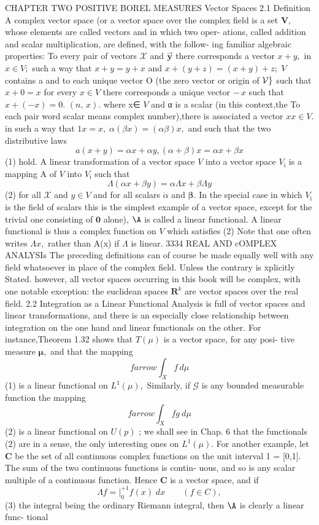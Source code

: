 CHAPTER TWO POSITIVE BOREL MEASURES Vector Spaces 2.1 Definition A complex vector space (or a vector space over the complex field is a set ${\boldsymbol{V}},$ whose elements are called vectors and in which two oper- ations, called addition and scalar multiplication, are defined, with the follow- ing familiar algebraic properties: To every pair of vectors $\scriptstyle{\mathcal{X}}$ and $\mathbf{\vec{y}}$ there corresponds a vector $x+y,$ in $x\in V;$ such a way that $x+y=y+x$ and $x+(y+z)=(x+y)+z;$ ${\mathbf{}}V$ contains a and to each unique vector O (the zero vector or origin of ${\cal{V}}\}$ such that $x+0=x$ for every $x\in V$ there corresponds a unique vector $-\,x$ such that $x+(-x)=0.$ $\scriptstyle(n,\,x).$ where x∈ ${\mathbf{}}V$ and α is a scalar (in this context,the To each pair word scalar means complex number),there is associated a vector $x x\in V.$ in such a way that $1x=x,\;\alpha(\beta x)=(\alpha\beta)x,$ and such that the two distributive laws $$ a(x+y)=\alpha x+\alpha y,(\alpha+\beta)x=\alpha x+\beta x $$ (1) hold. A linear transformation of a vector space ${\mathbf{}}V$ into a vector space $V_{\mathrm{i}}$ is a mapping A of ${\mathbf{}}V$ into $V_{\mathrm{i}}$ such that $$ \Lambda(\alpha x+\beta y)=\alpha\Lambda x+\beta\Lambda y $$ (2) for all $\scriptstyle{\mathcal{X}}$ and $y\in V$ and for all scalars $\scriptstyle{\dot{\alpha}}$ and ${\boldsymbol{\beta}}.$ In the special case in which $V_{\mathrm{i}}$ is the field of scalars this is the simplest example of a vector space, except for the trivial one consisting of $\mathbf{0}$ alone), $\mathrm{\A}$ is called a linear functional. A linear functional is thus a complex function on ${\mathbf{}}V$ which satisfies (2) Note that one often writes $\Lambda x,$ rather than A(x) if $\Lambda$ is linear. 3334 REAL AND cOMPLEX ANALYSIs The preceding definitions can of course be made equally well with any field whatsoever in place of the complex field. Unless the contrary is xplicitly Stated. however, all vector spaces occurring in this book will be complex, with one notable exception: the euclidean spaces ${\boldsymbol{R}}^{k}$ are vector spaces over the real field. 2.2 Integration as a Linear Functional Analysis is full of vector spaces and linear transformations, and there is an especially close relationship between integration on the one hand and linear functionals on the other. For instance,Theorem 1.32 shows that $\scriptstyle T(\mu)$ is a vector space, for any posi- tive measure ${\boldsymbol{\mu}},$ and that the mapping $$ f arrow\int_{X}f\,d\mu $$ (1) is a linear functional on $L^{1}(\mu),$ Similarly, if $\scriptstyle{\mathcal{G}}$ is any bounded measurable function the mapping $$ f{ arrow}\int_{X}f g\ d\mu $$ (2) is a linear functional on $\scriptstyle{U(p)}$ ; we shall see in Chap. 6 that the functionals (2) are in a sense, the only interesting ones on $L^{1}(\mu).$ For another example, let ${\boldsymbol{C}}$ be the set of all continuous complex functions on the unit interval 1 = [0,1]. The sum of the two continuous functions is contin- uous, and so is any scalar multiple of a continuous function. Hence ${\boldsymbol{C}}$ is a vector space, and if $$ \Lambda f= \vert_{0}^{+1}f(x)\;d x\qquad(f\in C), $$ (3) the integral being the ordinary Riemann integral, then $\mathrm{\A}$ is clearly a linear func- tional 